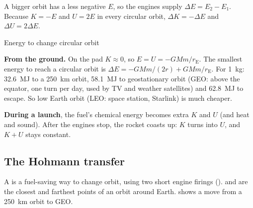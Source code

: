 A bigger orbit has a less negative $E$, so the engines supply
$\Delta E = E_2 - E_1$. Because $K = -E$ and $U = 2E$ in every circular orbit,
$\Delta K = -\Delta E$ and $\Delta U = 2\Delta E$.

\begin{formulacard}[notonsheet]{Energy to change circular orbit}
  \begin{symbols}
  \end{symbols}
\end{formulacard}



\textbf{From the ground.} On the pad $K \approx 0$, so
$E = U = -GMm/r_\mathrm{E}$. The smallest energy to reach a circular
orbit is $\Delta E = -GMm/(2r) + GMm/r_\mathrm{E}$. For
\qty{1}{kg}: \qty{32.6}{MJ} to a \qty{250}{km} orbit, \qty{58.1}{MJ} to
geostationary orbit (GEO: above the equator, one turn per day, used by TV and
weather satellites) and \qty{62.8}{MJ} to escape. So low Earth orbit (LEO: space
station, Starlink) is much cheaper.

\textbf{During a launch}, the fuel's chemical energy becomes extra $K$ and $U$
(and heat and sound). After the engines stop, the rocket coasts up: $K$ turns
into $U$, and $K + U$ stays constant.


\subsection{The Hohmann transfer}

A  is a fuel-saving way to change orbit, using two short
engine firings ().  and  are the closest
and farthest points of an orbit around Earth.  shows a
move from a \qty{250}{km} orbit to GEO.

